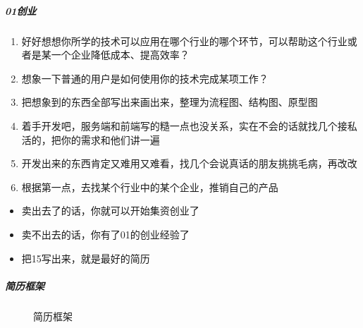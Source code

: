 \documentclass[letterpaper,10pt,english]{sphinxmanual}
\begin{document}
\subparagraph{0\sphinxhyphen{}1创业}
\label{\detokenize{chapter_interview/CV:id3}}\begin{enumerate}
%
\item {} 
好好想想你所学的技术可以应用在哪个行业的哪个环节，可以帮助这个行业或者是某一个企业降低成本、提高效率？

\item {} 
想象一下普通的用户是如何使用你的技术完成某项工作？

\item {} 
把想象到的东西全部写出来画出来，整理为流程图、结构图、原型图

\item {} 
着手开发吧，服务端和前端写的糙一点也没关系，实在不会的话就找几个接私活的，把你的需求和他们讲一遍

\item {} 
开发出来的东西肯定又难用又难看，找几个会说真话的朋友挑挑毛病，再改改

\item {} 
根据第一点，去找某个行业中的某个企业，推销自己的产品

\end{enumerate}
\begin{itemize}
\item {} 
卖出去了的话，你就可以开始集资创业了

\item {} 
卖不出去的话，你有了0\sphinxhyphen{}1的创业经验了

\item {} 
把1\sphinxhyphen{}5写出来，就是最好的简历

\end{itemize}


\subparagraph{简历框架}
\label{\detokenize{chapter_interview/CV:id4}}
\begin{figure}[H]
\centering
\capstart

\noindent{}
\caption{简历框架}\label{\detokenize{chapter_interview/CV:id9}}\end{figure}
\end{document}
